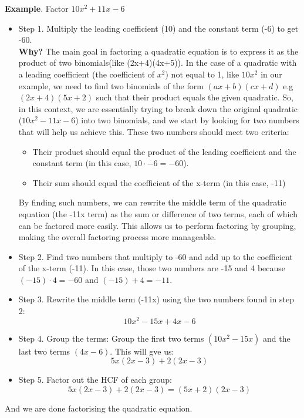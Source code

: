 \textbf{Example}. Factor $10x^2 + 11x - 6$ \\
\begin{itemize}
    \item Step 1. Multiply the leading coefficient (10) and the constant term (-6) to get -60. \\
    \textbf{Why?} The main goal in factoring a quadratic equation is to express it as the product of two binomials(like (2x+4)(4x+5)). 
    In the case of a quadratic with a leading coefficient (the coefficient of $x^2$) not equal to 1, like $10x^2$ in our example, we need to find two binomials of the form $(ax + b)(cx + d)$ e.g $(2x + 4)(5x+2)$ such that their product equals the given quadratic. 
    So, in this context, we are essentially trying to break down the original quadratic ($10x^2 - 11x - 6$) into two binomials, and we start by looking for two numbers that will help us achieve this. These two numbers should meet two criteria:
    \begin{itemize}
        \item Their product should equal the product of the leading coefficient and the constant term (in this case, $10 \cdot -6 = -60$).
        \item Their sum should equal the coefficient of the x-term (in this case, -11)
    \end{itemize}
    By finding such numbers, we can rewrite the middle term of the quadratic equation (the -11x term) as the sum or difference of two terms, each of which can be factored more easily. This allows us to perform factoring by grouping, making the overall factoring process more manageable.
    \item Step 2.  Find two numbers that multiply to -60 and add up to the coefficient of the x-term (-11). In this case, those two numbers are -15 and 4 because $(-15) \cdot 4 = -60$ and $(-15) + 4 = -11$.
    \item Step 3. Rewrite the middle term (-11x) using the two numbers found in step 2: 
    $$ 10x^2 - 15x + 4x - 6 $$
    \item Step 4. Group the terms: Group the first two terms $(10x^2 - 15x)$ and the last two terms $(4x - 6)$. This will gve us: 
    $$ 5x(2x - 3) + 2(2x - 3) $$
    \item Step 5. Factor out the HCF of each group: 
    $$ 5x(2x - 3) + 2(2x - 3) = (5x + 2)(2x - 3) $$

\end{itemize}
And we are done factorising the quadratic equation.

